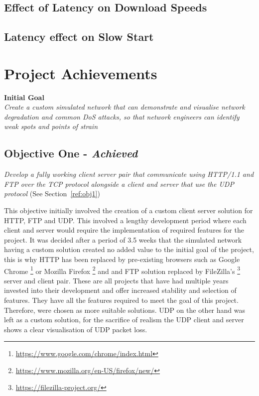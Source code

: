 \clearpage
\subsection{Effect of Latency on Download Speeds}


\subsection{Latency effect on Slow Start}


\clearpage
\section{Project Achievements}

{\bf Initial Goal}\\
{\it Create a custom simulated network that can demonstrate and visualise network degradation and common DoS attacks, so that network engineers can identify weak spots and points of strain}

\newcommand{\chromeUrl}{\url{https://www.google.com/chrome/index.html}}
\newcommand{\firefoxUrl}{\url{https://www.mozilla.org/en-US/firefox/new/}}
\newcommand{\fileZillaUrl}{\url{https://filezilla-project.org/}}

\subsection{Objective One - {\it Achieved}}
{\it Develop a fully working client server pair that communicate using HTTP/1.1 and FTP over the TCP protocol alongside a client and server that use the UDP protocol} (See Section~\ref{ref:obj1})

This objective initially involved the creation of a custom client server solution for HTTP, FTP and UDP. This involved a lengthy development period where each client and server would require the implementation of required features for the project. It was decided after a period of 3.5 weeks that the simulated network having a custom solution created no added value to the initial goal of the project, this is why HTTP has been replaced by pre-existing browsers such as Google Chrome \footnote{\chromeUrl} or Mozilla Firefox \footnote{\firefoxUrl} and and FTP solution replaced by FileZilla's \footnote{\fileZillaUrl} server and client pair. These are all projects that have had multiple years invested into their development and offer increased stability and selection of features. They have all the features required to meet the goal of this project. Therefore, were chosen as more suitable solutions. UDP on the other hand was left as a custom solution, for the sacrifice of realism the UDP client and server shows a clear visualisation of UDP packet loss.

